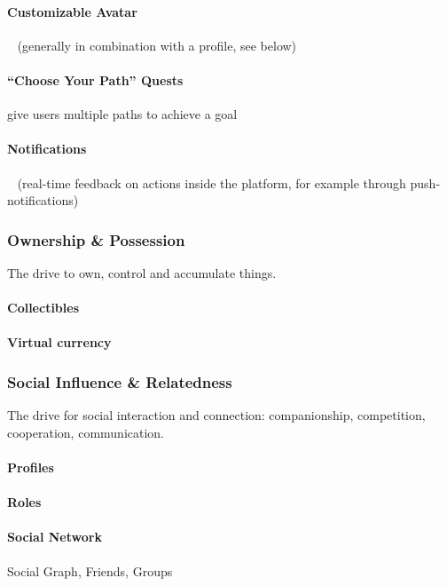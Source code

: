 \documentclass[runningheads]{llncs}
\begin{document}
\paragraph{Customizable Avatar}~\cite{SaHMM17} (generally in combination with a profile, see below)

\paragraph{\enquote{Choose Your Path} Quests} give users multiple paths to achieve a goal

\paragraph{Notifications}~\cite{SaHMM17} (real-time feedback on actions inside the platform, for example through push-notifications)

\subsubsection{Ownership \& Possession}\cite{Chou15} The drive to own, control and accumulate things.

\paragraph{Collectibles}

\paragraph{Virtual currency}

\subsubsection{Social Influence \& Relatedness}\cite{Chou15} The drive for social interaction and connection: companionship, competition, cooperation, communication.

\paragraph{Profiles}

\paragraph{Roles}

\paragraph{Social Network} Social Graph, Friends, Groups
\end{document}
